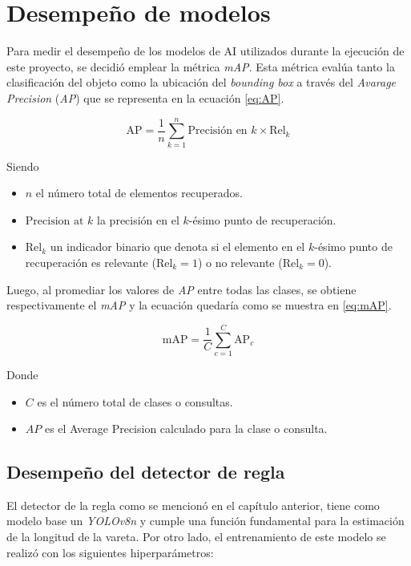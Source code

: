 \section{Desempeño de modelos}
\label{sec:desempeñoMod}

Para medir el desempeño de los modelos de AI utilizados durante la ejecución de este proyecto, se decidió emplear la métrica \textit{mAP}. Esta métrica evalúa tanto la clasificación del objeto como la ubicación del \textit{bounding box} a través del \textit{Avarage Precision} (\textit{AP}) que se representa en la ecuación \ref{eq:AP}.

\begin{equation}
    \label{eq:AP}
    \text{AP} = \frac{1}{n} \sum_{k=1}^n \text{Precisión en } k \times \text{Rel}_{k}
\end{equation}

Siendo
\begin{itemize}
    \item \( n \) el número total de elementos recuperados.
    \item \(\text{Precision at } k\) la precisión en el \( k \)-ésimo punto de recuperación.
    \item \(\text{Rel}_{k}\) un indicador binario que denota si el elemento en el \( k \)-ésimo punto de recuperación es relevante (\( \text{Rel}_{k} = 1 \)) o no relevante (\( \text{Rel}_{k} = 0 \)).
\end{itemize}

Luego, al promediar los valores de \textit{AP} entre todas las clases, se obtiene respectivamente el \textit{mAP} y la ecuación quedaría como se muestra en \ref{eq:mAP}.

\begin{equation}
    \label{eq:mAP}
    \text{mAP} = \frac{1}{C} \sum_{c=1}^C \text{AP}_c
\end{equation}

Donde 
\begin{itemize}
	\item \( C \) es el número total de clases o consultas.
    \item \( AP \) es el Average Precision calculado para la clase o consulta.
\end{itemize}

\subsection{Desempeño del detector de regla}

El detector de la regla como se mencionó en el capítulo anterior,  tiene como modelo base un \textit{YOLOv8n} y cumple una función fundamental para la estimación de la longitud de la vareta. Por otro lado, el entrenamiento de este modelo se realizó con los siguientes hiperparámetros:

